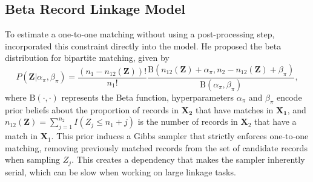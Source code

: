 \documentclass[ba]{imsart}
\begin{document}
\subsection{Beta Record Linkage Model}
\label{BRL}

To estimate a one-to-one matching without using a post-processing step, \cite{sadinle_bayesian_2017} incorporated this constraint directly into the model. He proposed the  beta distribution for bipartite matching, given by
$$P(\bm{Z}|\alpha_{\pi}, \beta_{\pi}) = \frac{(n_1 - n_{12}(\bm{Z}))!}{n_1 !}\frac{\text{B}(n_{12}(\bm{Z}) + \alpha_{\pi}, n_2 - n_{12}(\bm{Z}) + \beta_{\pi})}{\text{B}(\alpha_{\pi}, \beta_{\pi})},
$$
where $\text{B}(\cdot, \cdot)$ represents the Beta function, hyperparameters $\alpha_{\pi}$ and $\beta_{\pi}$ encode prior beliefs about the proportion of records in $\bm{X_2}$ that have matches in $\bm{X_1}$, and $n_{12}(\bm{Z}) = \sum_{j=1}^{n_2} I(Z_j \leq n_1 + j)$ is the number of records in $\bm{X}_2$ that have a match in $\bm{X}_1$. This prior induces a Gibbs sampler that strictly enforces one-to-one matching, removing previously matched records from the set of candidate records when sampling \(Z_j\). This creates a dependency that makes the sampler inherently serial, which can be slow when working on large linkage tasks.

\end{document}
